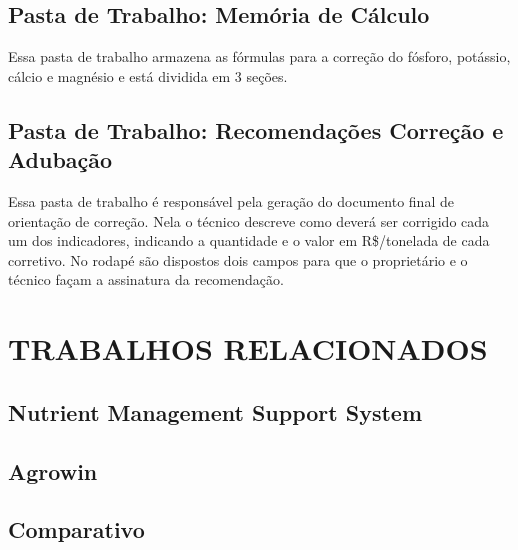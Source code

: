 \subsection{Pasta de Trabalho: Memória de Cálculo}
\label{subsec:memoriadecalculo}

Essa pasta de trabalho armazena as fórmulas para a correção do fósforo, potássio, cálcio e magnésio e está dividida em 3 seções.

\subsection{Pasta de Trabalho: Recomendações Correção e Adubação}
\label{subsec:recomendacoes}

Essa pasta de trabalho é responsável pela geração do documento final de orientação de correção. Nela o técnico descreve como deverá ser corrigido cada um dos indicadores, indicando a quantidade e o valor em R\$/tonelada de cada corretivo.
No rodapé são dispostos dois campos para que o proprietário e o técnico façam a assinatura da recomendação.

\section{TRABALHOS RELACIONADOS}
\label{sec:trabalhosrelacionados}

\subsection{Nutrient Management Support System}
\label{sub:numass}


\subsection{Agrowin}
\label{sub:agrowin}


\subsection{Comparativo}
\label{sub:comparativo}
